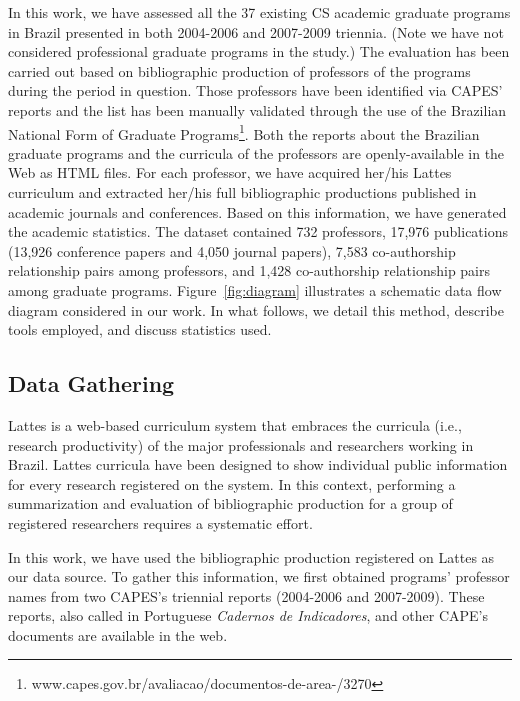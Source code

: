 \documentclass[10pt]{article}
\begin{document}
In this work, we have assessed all the 37 existing CS academic graduate programs in Brazil presented in both 2004-2006 and
2007-2009 triennia. (Note we have not considered professional graduate programs in the study.)  The evaluation has been
carried out based on bibliographic production 
of professors of the programs during the period in question. Those professors have been identified via CAPES' reports and
the list has been manually validated through the use of the Brazilian National Form of Graduate
Programs\footnote{www.capes.gov.br/avaliacao/documentos-de-area-/3270}. Both the reports about the Brazilian graduate
programs and the curricula of the professors are openly-available in the Web as HTML files.
For each professor, we have acquired her/his Lattes curriculum and extracted her/his full bibliographic
productions published in academic journals and conferences. Based on this information, we have generated the academic
statistics.  The dataset contained 732 professors, 17,976 publications (13,926 conference papers and 4,050 journal papers), 7,583
co-authorship relationship pairs among professors, and 1,428 co-authorship relationship pairs among graduate programs.
Figure~\ref{fig:diagram} illustrates a schematic data flow diagram considered in our work. In what follows, we detail this
method, describe tools employed, and discuss statistics used.




\subsection*{Data Gathering}

Lattes is a web-based curriculum system that embraces the curricula (i.e.,
research productivity) of the major professionals and researchers working in Brazil. Lattes curricula have been designed to
show individual public information for every research registered on the system. In this context, performing a summarization
and evaluation of bibliographic production for a group of registered researchers requires a systematic effort.

In this work, we have used the bibliographic production registered on Lattes as our data source. To gather this information,
we first obtained programs' professor names from two CAPES's triennial reports (2004-2006 and 2007-2009). These reports, also
called in Portuguese {\em Cadernos de Indicadores}, and other CAPE's documents are available in the web.
\end{document}
